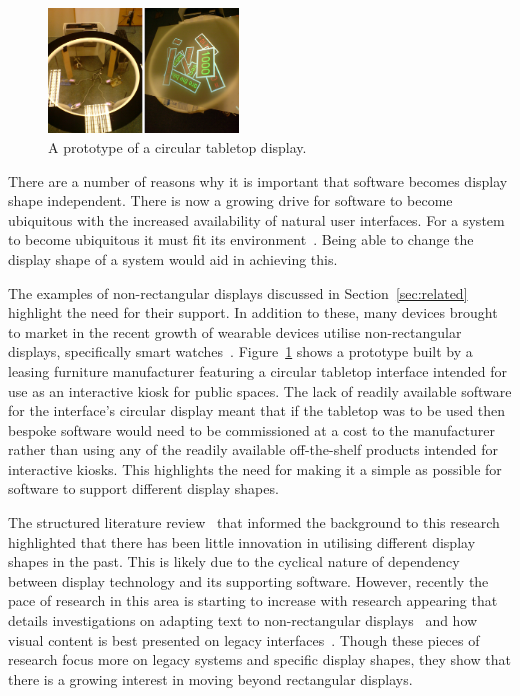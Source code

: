 \documentclass[review,5p,times,twocolumn]{elsarticle}
\begin{document}
\begin{figure}[h]
 \centering
   \includegraphics[width=0.45\textwidth]{figures/prototype.png}
   \caption{A prototype of a circular tabletop display.}
   \label{fig:prototypeTabletop}
\end{figure}

There are a number of reasons why it is important that software becomes display shape independent.
There is now a growing drive for software to become ubiquitous with the increased availability of natural user interfaces.
For a system to become ubiquitous it must fit its environment~\cite{Greenfield2006}.
Being able to change the display shape of a system would aid in achieving this.

The examples of non-rectangular displays discussed in Section~\ref{sec:related} highlight the need for their support.
In addition to these, many devices brought to market in the recent growth of wearable devices utilise non-rectangular displays, specifically smart watches~\cite{Jung2016}.
Figure~\ref{fig:prototypeTabletop} shows a prototype built by a leasing furniture manufacturer featuring a circular tabletop interface intended for use as an interactive kiosk for public spaces.
The lack of readily available software for the interface's circular display meant that if the tabletop was to be used then bespoke software would need to be commissioned at a cost to the manufacturer rather than using any of the readily available off-the-shelf products intended for interactive kiosks.
This highlights the need for making it a simple as possible for software to support different display shapes.

The structured literature review~\cite{Kitchenham2004} that informed the background to this research highlighted that there has been little innovation in utilising different display shapes in the past.
This is likely due to the cyclical nature of dependency between display technology and its supporting software.
However, recently the pace of research in this area is starting to increase with research appearing that details investigations on adapting text to non-rectangular displays~\cite{Serrano2016} and how visual content is best presented on legacy interfaces~\cite{Serrano2017}.
Though these pieces of research focus more on legacy systems and specific display shapes, they show that there is a growing interest in moving beyond rectangular displays.
\end{document}
